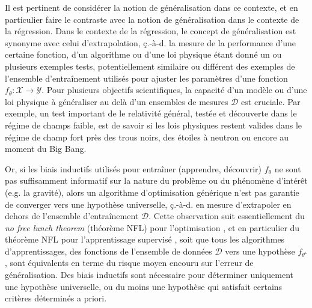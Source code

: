 Il est pertinent de considérer la notion de généralisation dans ce contexte, et en particulier faire le contraste avec 
la notion de généralisation dans le contexte de la régression. Dans le contexte de la régression, le concept de généralisation est synonyme 
avec celui d'extrapolation, ç.-à-d. la mesure de la performance d'une certaine fonction, d'un algorithme ou d'une loi physique 
étant donné un ou plusieurs exemples tests, 
potentiellement similaire ou différent des exemples de l'ensemble d'entraînement utilisés pour ajuster les paramètres d'une fonction 
$f_\theta: \mathcal{X} \rightarrow \mathcal{Y}$. Pour plusieurs objectifs scientifiques, la capacité d'un modèle ou d'une loi physique  
à généraliser au delà d'un ensembles de mesures $\mathcal{D}$ est cruciale. 
Par exemple, un test important de le relativité général, testée et découverte dans le régime de champs faible, est 
de savoir si les lois physiques restent valides dans le régime de champ fort près des trous noirs, des étoiles à neutron ou encore 
au moment du Big Bang. 

Or, si les biais inductifs utilisés pour entraîner (apprendre, découvrir) $f_{\theta}$ ne sont pas suffisamment 
informatif sur la nature du problème ou du phénomène d'intérêt (e.g. la gravité), 
alors un algorithme d'optimisation générique n'est pas garantie de converger vers 
une hypothèse universelle, ç.-à-d. en mesure d'extrapoler en dehors de l'ensemble 
d'entraînement $\mathcal{D}$.
Cette observation suit essentiellement du \textit{no free lunch theorem} (théorème NFL) pour 
l'optimisation \citep{Wolpert1997}, et en particulier 
du théorème NFL pour l'apprentissage supervisé \citep{Wolpert1992,Wolpert1996}, soit que tous les 
algorithmes d'apprentissages, des fonctions de l'ensemble de données $\mathcal{D}$ vers une hypothèse $f_{\theta^{\star}}$, 
sont équivalents en terme du risque moyen encouru sur l'erreur de généralisation. 
Des biais inductifs sont nécessaire pour déterminer uniquement une hypothèse universelle, 
ou du moins une hypothèse qui satisfait certains critères déterminés a priori.


